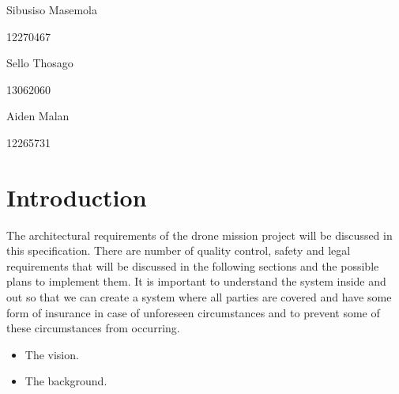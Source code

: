 \documentclass{article}
\begin{document}
\begin{titlepage}
\begin{center}
			\begin{minipage}{0.4\textwidth}
				\begin{flushleft} \large
					Sibusiso {Masemola}
				\end{flushleft}
			\end{minipage}
			\begin{minipage}{0.4\textwidth}
				\begin{flushright} \large
					\emph{}
					12270467
				\end{flushright}
			\end{minipage}
			
			\begin{minipage}{0.4\textwidth}
				\begin{flushleft} \large
					Sello {Thosago}
				\end{flushleft}
			\end{minipage}
			\begin{minipage}{0.4\textwidth}
				\begin{flushright} \large
					\emph{}
					13062060
				\end{flushright}
			\end{minipage}
			
			\begin{minipage}{0.4\textwidth}
				\begin{flushleft} \large
					Aiden {Malan}
				\end{flushleft}
			\end{minipage}
			\begin{minipage}{0.4\textwidth}
				\begin{flushright} \large
					\emph{}
					12265731
				\end{flushright}
			\end{minipage}
			
			
			\vfill
			
		\end{center}
	\end{titlepage}
	\footnotesize
	\normalsize
	
	
	\tableofcontents
	\newpage
	
	\newpage %
	\section{Introduction} 
	The architectural requirements of the drone mission project will be discussed in this specification. There are number of quality control, safety and legal requirements that will be discussed in the following sections and the possible plans to implement them. It is important to understand the system inside and out so that we can create a system where all parties are covered and have some form of insurance in case of unforeseen circumstances and to prevent some of these circumstances from occurring.
	\begin{itemize} 
		\item The vision.
		\item The background.
	\end{itemize}
	
\end{document}

